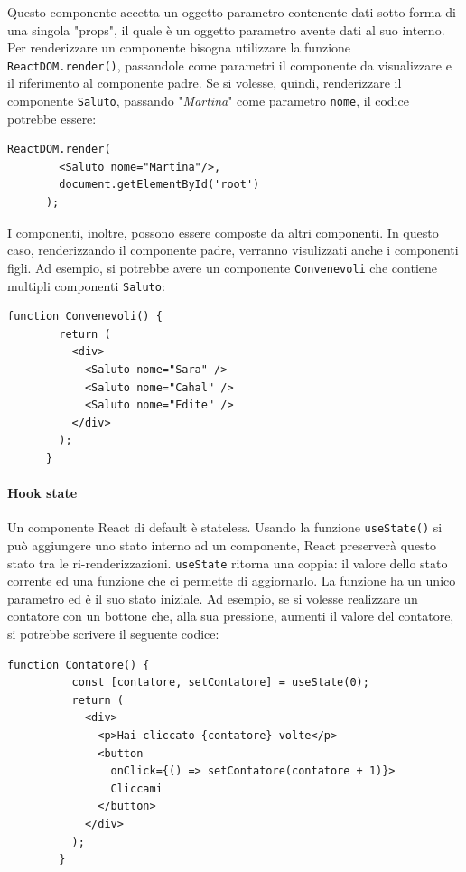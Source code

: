\documentclass[a4paper]{article}
\begin{document}
    Questo componente accetta un oggetto parametro contenente dati sotto forma di una singola
    "props", il quale è un oggetto parametro avente dati al suo interno.
    Per renderizzare un componente bisogna utilizzare la funzione \verb|ReactDOM.render()|,
    passandole come parametri il componente da visualizzare e il riferimento al componente padre.
    Se si volesse, quindi, renderizzare il componente \verb|Saluto|, passando "\emph{Martina}" come parametro \verb|nome|, il codice potrebbe essere:
    
    \begin{lstlisting}[style=ES6, title={Esempio composizione di componenti}]
      ReactDOM.render(
        <Saluto nome="Martina"/>, 
        document.getElementById('root')
      );\end{lstlisting}
    
    I componenti, inoltre, possono essere composte da altri componenti. In questo caso,
    renderizzando il componente padre, verranno visulizzati anche i componenti figli. Ad esempio, 
    si potrebbe avere un componente \verb|Convenevoli| che contiene multipli componenti \verb|Saluto|:
    \begin{lstlisting}[style=ES6, title={Esempio renderizzazione componente}]
      function Convenevoli() {
        return (
          <div>
            <Saluto nome="Sara" />
            <Saluto nome="Cahal" />
            <Saluto nome="Edite" />
          </div>
        );
      }\end{lstlisting}

      \paragraph{Hook state}
      Un componente React di default è stateless. Usando la funzione \verb|useState()| si può
      aggiungere uno stato interno ad un componente, React preserverà questo stato tra le ri-renderizzazioni.
      \verb|useState| ritorna una coppia: il valore dello stato corrente ed una funzione che ci permette di aggiornarlo.
      La funzione ha un unico parametro ed è il suo stato iniziale. Ad esempio, se si volesse realizzare un contatore con un bottone che, alla sua pressione,
      aumenti il valore del contatore, si potrebbe scrivere il seguente codice:
      \begin{lstlisting}[style=ES6, title={Esempio contatore con stato interno}]
        function Contatore() {
          const [contatore, setContatore] = useState(0);
          return (
            <div>
              <p>Hai cliccato {contatore} volte</p>
              <button 
                onClick={() => setContatore(contatore + 1)}>
                Cliccami
              </button>
            </div>
          );
        }
      \end{lstlisting}
\end{document}
